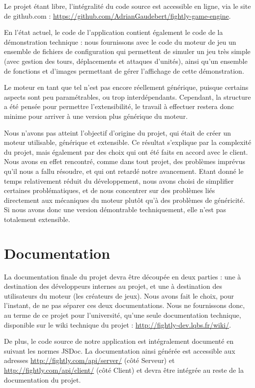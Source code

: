 \documentclass[a4paper,10pt]{report}
\begin{document}
    Le projet étant libre, l'intégralité du code source est accessible en ligne, via le site de github.com : \url{https://github.com/AdrianGaudebert/fightly-game-engine}. 

    En l'état actuel, le code de l'application contient également le code de la démonstration technique : nous fournissons avec le code du moteur de jeu un ensemble de fichiers de configuration qui permettent de simuler un jeu très simple (avec gestion des tours, déplacements et attaques d'unités), ainsi qu'un ensemble de fonctions et d'images permettant de gérer l'affichage de cette démonstration. 

    Le moteur en tant que tel n'est pas encore réellement générique, puisque certains aspects sont peu paramétrables, ou trop interdépendants. Cependant, la structure a été pensée pour permettre l'extensibilité, le travail à effectuer restera donc minime pour arriver à une version plus générique du moteur. 

    Nous n'avons pas atteint l'objectif d'origine du projet, qui était de créer un moteur utilisable, générique et extensible. Ce résultat s'explique par la complexité du projet, mais également par des choix qui ont été faits en accord avec le client. Nous avons en effet rencontré, comme dans tout projet, des problèmes imprévus qu'il nous a fallu résoudre, et qui ont retardé notre avancement. Etant donné le temps relativement réduit du développement, nous avons choisi de simplifier certaines problématiques, et de nous concentrer sur des problèmes liés directement aux mécaniques du moteur plutôt qu'à des problèmes de généricité. Si nous avons donc une version démontrable techniquement, elle n'est pas totalement extensible. 

    \section{Documentation}

    La documentation finale du projet devra être découpée en deux parties : une à destination des développeurs internes au projet, et une à destination des utilisateurs du moteur (les créateurs de jeux). Nous avons fait le choix, pour l'instant, de ne pas séparer ces deux documentations. Nous ne fournissons donc, au terme de ce projet pour l'université, qu'une seule documentation technique, disponible sur le wiki technique du projet : \url{http://fightly-dev.lqbs.fr/wiki/}. 

    De plus, le code source de notre application est intégralement documenté en suivant les normes JSDoc. La documentation ainsi générée est accessible aux adresses \url{http://fightly.com/api/server/} (côté Serveur) et \url{http://fightly.com/api/client/} (côté Client) et devra être intégrée au reste de la documentation du projet. 
\end{document}
